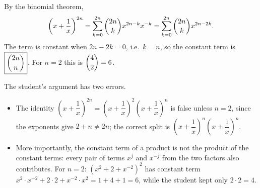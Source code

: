 By the binomial theorem,
\[
\left(x+\dfrac{1}{x}\right)^{2n}=\sum_{k=0}^{2n}\dbinom{2n}{k}x^{2n-k}x^{-k}=\sum_{k=0}^{2n}\dbinom{2n}{k}x^{2n-2k}.
\]
The term is constant when $2n-2k=0$, i.e.\ $k=n$, so the constant term is $\boxed{\dbinom{2n}{n}}$. For $n=2$ this is $\dbinom42=6$.

The student's argument has two errors.
\begin{itemize}
\item The identity $\left(x+\dfrac{1}{x}\right)^{2n}=\left(x+\dfrac{1}{x}\right)^{2}\left(x+\dfrac{1}{x}\right)^{n}$ is false unless $n=2$, since the exponents give $2+n\ne2n$; the correct split is $\left(x+\dfrac{1}{x}\right)^{n}\left(x+\dfrac{1}{x}\right)^{n}$.
\item More importantly, the constant term of a product is not the product of the constant terms: every pair of terms $x^j$ and $x^{-j}$ from the two factors also contributes. For $n=2$: $\left(x^2+2+x^{-2}\right)^2$ has constant term $x^2\cdot x^{-2}+2\cdot2+x^{-2}\cdot x^2=1+4+1=6$, while the student kept only $2\cdot2=4$.
\end{itemize}
